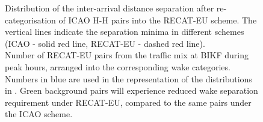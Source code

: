 \begin{figure}[h]
    \centering
    
    \vspace{1cm}
    
    
    \caption[Inter-arrival distance separation of ICAO H-H pairs into the RECAT-EU scheme]{\protect{} Distribution of the inter-arrival distance separation after re-categorisation of ICAO H-H pairs into the RECAT-EU scheme. The vertical lines indicate the separation minima in different schemes (ICAO - solid red line, RECAT-EU - dashed red line).\\ \protect{} Number of RECAT-EU pairs from the traffic mix at BIKF during peak hours, arranged into the corresponding wake categories. Numbers in blue are used in the representation of the distributions in \protect{}. Green background pairs will experience reduced wake separation requirement under RECAT-EU, compared to the same pairs under the ICAO scheme.}
    \label{fig:HH_to_RECAT_pairs_dist_separ}
\end{figure}

